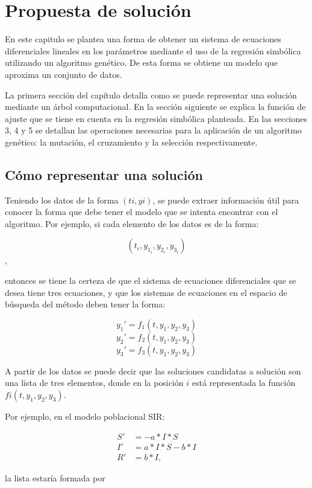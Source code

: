 \chapter{Propuesta de solución}\label{chapter:solution_proposal}

En este capitulo se plantea una forma de obtener un sistema de ecuaciones diferenciales lineales en los parámetros mediante el uso de la regresión simbólica utilizando un algoritmo genético. De esta forma se obtiene un modelo que aproxima un conjunto de datos.

La primera sección del capítulo detalla como se puede representar una solución mediante un árbol computacional. En la sección siguiente se explica la función de ajuste que se tiene en cuenta en la regresión simbólica planteada. En las secciones 3, 4 y 5 se detallan las operaciones necesarias para la aplicación de un algoritmo genético: la mutación, el cruzamiento y la selección respectivamente.

\section{Cómo representar una solución}

Teniendo los datos de la forma $(ti, yi)$, se puede extraer información útil para conocer la forma que debe tener el modelo que se intenta encontrar con el algoritmo. Por ejemplo, si cada elemento de los datos es de la forma:

$$(t_i, y_{1_i}, y_{2_i}, y_{3_i})$$,

entonces se tiene la certeza de que el sistema de ecuaciones diferenciales que se desea tiene tres ecuaciones, y que los sistemas de ecuaciones en el espacio de búsqueda del método deben tener la forma:

$$y_1' = f_1(t, y_1, y_2, y_3)$$
$$y_2' = f_2(t, y_1, y_2, y_3)$$
$$y_3' = f_3(t, y_1, y_2, y_3)$$

A partir de los datos se puede decir que las soluciones candidatas a solución son una lista de tres elementos, donde en la posición $i$ está representada la función $fi(t,y_1,y_2,y_3)$.

Por ejemplo, en el modelo poblacional SIR:

\begin{align*}
    S' & = - a*I*S     \\
    I' & = a*I*S - b*I \\
    R' & = b*I,
\end{align*}

la lista estaría formada por


